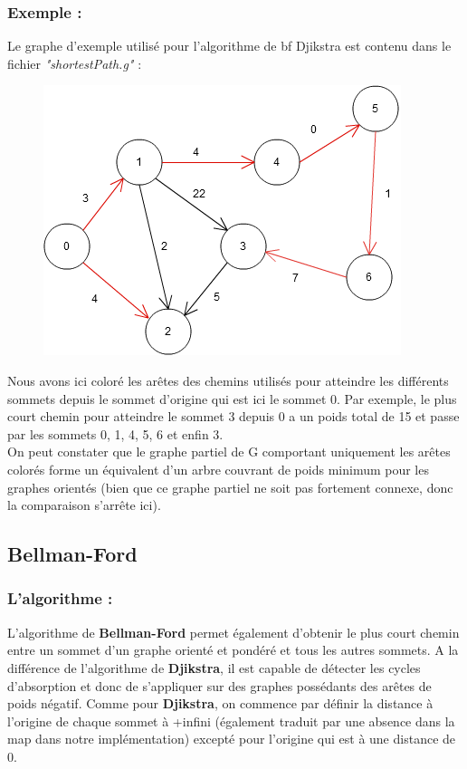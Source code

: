 \documentclass[12pt]{article}
\begin{document}
\subsubsection{Exemple :}
Le graphe d'exemple utilisé pour l'algorithme de {bf Djikstra} est contenu dans le fichier {\it "shortestPath.g"} :\\ 

\begin{figure}[h]
\centering
\includegraphics[scale=.8]{imgs/schema3.png}
\end{figure}

Nous avons ici coloré les arêtes des chemins utilisés pour atteindre les différents sommets depuis le sommet d'origine qui est ici le sommet 0. Par exemple, le plus court chemin pour atteindre le sommet 3 depuis 0 a un poids total de 15 et passe par les sommets 0, 1, 4, 5, 6 et enfin 3. \\
On peut constater que le graphe partiel de G comportant uniquement les arêtes colorés forme un équivalent d'un arbre couvrant de poids minimum pour les graphes orientés (bien que ce graphe partiel ne soit pas fortement connexe, donc la comparaison s'arrête ici). \\

\clearpage
\subsection{Bellman-Ford}
\subsubsection{L'algorithme :}
L'algorithme de {\bf Bellman-Ford} permet également d'obtenir le plus court chemin entre un sommet d'un graphe orienté et pondéré et tous les autres sommets. A la différence de l'algorithme de {\bf Djikstra}, il est capable de détecter les cycles d'absorption et donc de s'appliquer sur des graphes possédants des arêtes de poids négatif.
Comme pour {\bf Djikstra}, on commence par définir la distance à l'origine de chaque sommet à +infini (également traduit par une absence dans la map dans notre implémentation) excepté pour l'origine qui est à une distance de 0. \\
\end{document}
